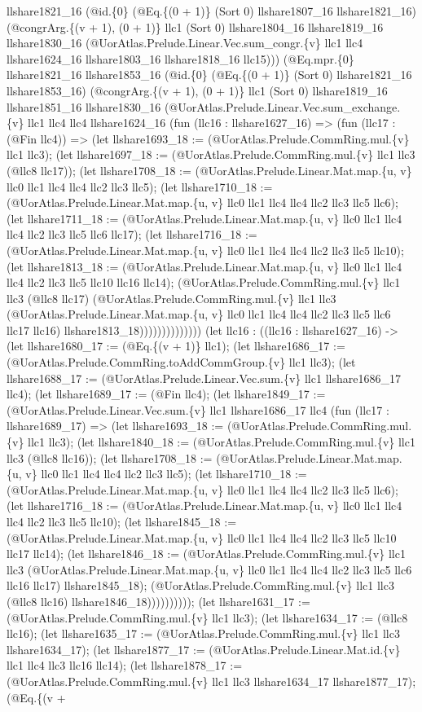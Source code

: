 \documentclass[11pt]{article}
\begin{document}
llshare1821\_16 (@id.\{0\} (@Eq.\{(0 + 1)\} (Sort 0) llshare1807\_16 llshare1821\_16) (@congrArg.\{(v + 1), (0 + 1)\} llc1 (Sort 0) llshare1804\_16 llshare1819\_16 llshare1830\_16 (@UorAtlas.Prelude.Linear.Vec.sum\_congr.\{v\} llc1 llc4 llshare1624\_16 llshare1803\_16 llshare1818\_16 llc15))) (@Eq.mpr.\{0\} llshare1821\_16 llshare1853\_16 (@id.\{0\} (@Eq.\{(0 + 1)\} (Sort 0) llshare1821\_16 llshare1853\_16) (@congrArg.\{(v + 1), (0 + 1)\} llc1 (Sort 0) llshare1819\_16 llshare1851\_16 llshare1830\_16 (@UorAtlas.Prelude.Linear.Vec.sum\_exchange.\{v\} llc1 llc4 llc4 llshare1624\_16 (fun (llc16 : llshare1627\_16) => (fun (llc17 : (@Fin llc4)) => (let llshare1693\_18 := (@UorAtlas.Prelude.CommRing.mul.\{v\} llc1 llc3); (let llshare1697\_18 := (@UorAtlas.Prelude.CommRing.mul.\{v\} llc1 llc3 (@llc8 llc17)); (let llshare1708\_18 := (@UorAtlas.Prelude.Linear.Mat.map.\{u, v\} llc0 llc1 llc4 llc4 llc2 llc3 llc5); (let llshare1710\_18 := (@UorAtlas.Prelude.Linear.Mat.map.\{u, v\} llc0 llc1 llc4 llc4 llc2 llc3 llc5 llc6); (let llshare1711\_18 := (@UorAtlas.Prelude.Linear.Mat.map.\{u, v\} llc0 llc1 llc4 llc4 llc2 llc3 llc5 llc6 llc17); (let llshare1716\_18 := (@UorAtlas.Prelude.Linear.Mat.map.\{u, v\} llc0 llc1 llc4 llc4 llc2 llc3 llc5 llc10); (let llshare1813\_18 := (@UorAtlas.Prelude.Linear.Mat.map.\{u, v\} llc0 llc1 llc4 llc4 llc2 llc3 llc5 llc10 llc16 llc14); (@UorAtlas.Prelude.CommRing.mul.\{v\} llc1 llc3 (@llc8 llc17) (@UorAtlas.Prelude.CommRing.mul.\{v\} llc1 llc3 (@UorAtlas.Prelude.Linear.Mat.map.\{u, v\} llc0 llc1 llc4 llc4 llc2 llc3 llc5 llc6 llc17 llc16) llshare1813\_18)))))))))))))) (let llc16 : ((llc16 : llshare1627\_16) -> (let llshare1680\_17 := (@Eq.\{(v + 1)\} llc1); (let llshare1686\_17 := (@UorAtlas.Prelude.CommRing.toAddCommGroup.\{v\} llc1 llc3); (let llshare1688\_17 := (@UorAtlas.Prelude.Linear.Vec.sum.\{v\} llc1 llshare1686\_17 llc4); (let llshare1689\_17 := (@Fin llc4); (let llshare1849\_17 := (@UorAtlas.Prelude.Linear.Vec.sum.\{v\} llc1 llshare1686\_17 llc4 (fun (llc17 : llshare1689\_17) => (let llshare1693\_18 := (@UorAtlas.Prelude.CommRing.mul.\{v\} llc1 llc3); (let llshare1840\_18 := (@UorAtlas.Prelude.CommRing.mul.\{v\} llc1 llc3 (@llc8 llc16)); (let llshare1708\_18 := (@UorAtlas.Prelude.Linear.Mat.map.\{u, v\} llc0 llc1 llc4 llc4 llc2 llc3 llc5); (let llshare1710\_18 := (@UorAtlas.Prelude.Linear.Mat.map.\{u, v\} llc0 llc1 llc4 llc4 llc2 llc3 llc5 llc6); (let llshare1716\_18 := (@UorAtlas.Prelude.Linear.Mat.map.\{u, v\} llc0 llc1 llc4 llc4 llc2 llc3 llc5 llc10); (let llshare1845\_18 := (@UorAtlas.Prelude.Linear.Mat.map.\{u, v\} llc0 llc1 llc4 llc4 llc2 llc3 llc5 llc10 llc17 llc14); (let llshare1846\_18 := (@UorAtlas.Prelude.CommRing.mul.\{v\} llc1 llc3 (@UorAtlas.Prelude.Linear.Mat.map.\{u, v\} llc0 llc1 llc4 llc4 llc2 llc3 llc5 llc6 llc16 llc17) llshare1845\_18); (@UorAtlas.Prelude.CommRing.mul.\{v\} llc1 llc3 (@llc8 llc16) llshare1846\_18)))))))))); (let llshare1631\_17 := (@UorAtlas.Prelude.CommRing.mul.\{v\} llc1 llc3); (let llshare1634\_17 := (@llc8 llc16); (let llshare1635\_17 := (@UorAtlas.Prelude.CommRing.mul.\{v\} llc1 llc3 llshare1634\_17); (let llshare1877\_17 := (@UorAtlas.Prelude.Linear.Mat.id.\{v\} llc1 llc4 llc3 llc16 llc14); (let llshare1878\_17 := (@UorAtlas.Prelude.CommRing.mul.\{v\} llc1 llc3 llshare1634\_17 llshare1877\_17); (@Eq.\{(v + 
\end{document}
